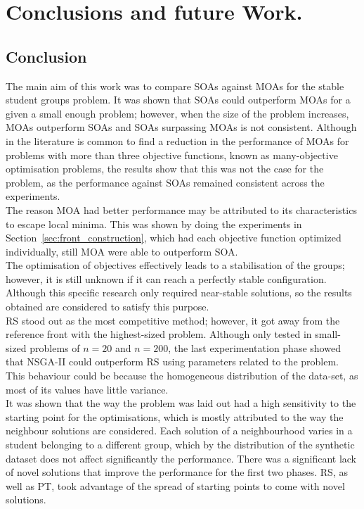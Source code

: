 \chapter{Conclusions and future Work.}
\label{chapter:chapter06}

\section{Conclusion}

The main aim of this work was to compare SOAs against MOAs for the stable student groups problem. It was shown that SOAs could outperform MOAs for a given a small enough problem; however, when the size of the problem increases, MOAs outperform SOAs and SOAs surpassing MOAs is not consistent. Although in the literature is common to find a reduction in the performance of MOAs for problems with more than three objective functions, known as many-objective optimisation problems, the results show that this was not the case for the problem, as the performance against SOAs remained consistent across the experiments. \\

The reason MOA had better performance may be attributed to its characteristics to escape local minima. This was shown by doing the experiments in Section~\ref{sec:front_construction}, which had each objective function optimized individually, still MOA were able to outperform SOA.\\

The optimisation of objectives effectively leads to a stabilisation of the groups; however, it is still unknown if it can reach a perfectly stable configuration. Although this specific research only required near-stable solutions, so the results obtained are considered to satisfy this purpose.\\

RS stood out as the most competitive method; however, it got away from the reference front with the highest-sized problem. Although only tested in small-sized problems of $n=20$ and $n=200$, the last experimentation phase showed that NSGA-II could outperform RS using parameters related to the problem. This behaviour could be because the homogeneous distribution of the data-set, as most of its values have little variance.\\

It was shown that the way the problem was laid out had a high sensitivity to the starting point for the optimisations, which is mostly attributed to the way the neighbour solutions are considered. Each solution of a neighbourhood varies in a student belonging to a different group, which by the distribution of the synthetic dataset does not affect significantly the performance. There was a significant lack of novel solutions that improve the performance for the first two phases. RS, as well as PT, took advantage of the spread of starting points to come with novel solutions.\\

